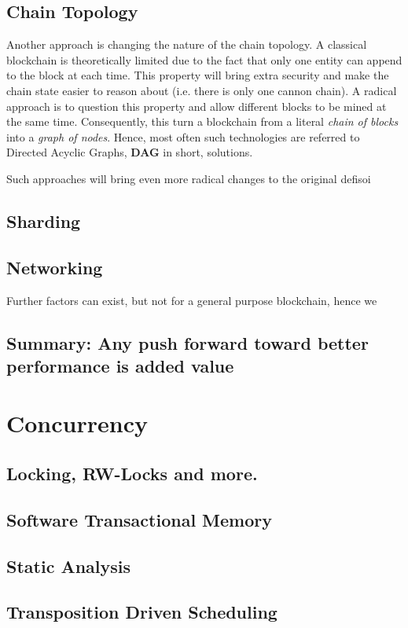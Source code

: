 \subsection{Chain Topology}

Another approach is changing the nature of the chain topology. A classical blockchain is theoretically limited due to the fact that only one entity can append to the block at each time. This property will bring extra security and make the chain state easier to reason about (i.e. there is only one cannon chain). A radical approach is to question this property and allow different blocks to be mined at the same time. Consequently, this turn a blockchain from a literal \textit{chain of blocks} into a \textit{graph of nodes}. Hence, most often such technologies are referred to Directed Acyclic Graphs, \textbf{DAG} in short, solutions. 

Such approaches will bring even more radical changes to the original defisoi

\subsection{Sharding}

\subsection{Networking}

Further factors can exist, but not for a general purpose blockchain, hence we 

\subsection{Summary: Any push forward toward better performance is added value} \label{chap_bg:subsec:summary_speedup}


\section{Concurrency}

\subsection{Locking, RW-Locks and more.}
\subsection{Software Transactional Memory}
\subsection{Static Analysis}
\subsection{Transposition Driven Scheduling}


